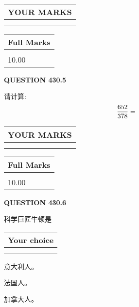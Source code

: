 \documentclass{ctexart}
\begin{document}
\noindent\begin{tabular}{|l|}
\hline
 YOUR MARKS  \\
\hline
 \\ 
 \\ 
\hline
\end{tabular}
\hspace{0.05in} \begin{tabular}{|l|}
\hline
 Full Marks  \\
\hline
 \\ 
10.00 \\
\hline
\end{tabular}
{\textbf{\Large{QUESTION
430.5 
}}}
  
  
 
请计算:
\begin{equation}
\frac { %
652 }  {  %
378} = \nonumber
\end{equation}
 

 

 
  
\vspace{0.2in}
  
\noindent\begin{tabular}{|l|}
\hline
 YOUR MARKS  \\
\hline
 \\ 
 \\ 
\hline
\end{tabular}
\hspace{0.05in} \begin{tabular}{|l|}
\hline
 Full Marks  \\
\hline
 \\ 
10.00 \\
\hline
\end{tabular}
{\textbf{\Large{QUESTION
430.6 
}}}
  
  
科学巨匠牛顿是
  
  
\noindent\hspace{3.0in} \begin{tabular}{|l|}
\hline
Your choice \\
\hline
 \\ 
 \\ 
\hline
\end{tabular}
  
  
 
 
意大利人。
 
 
法国人。
 
 
加拿大人。
 
\end{document}
